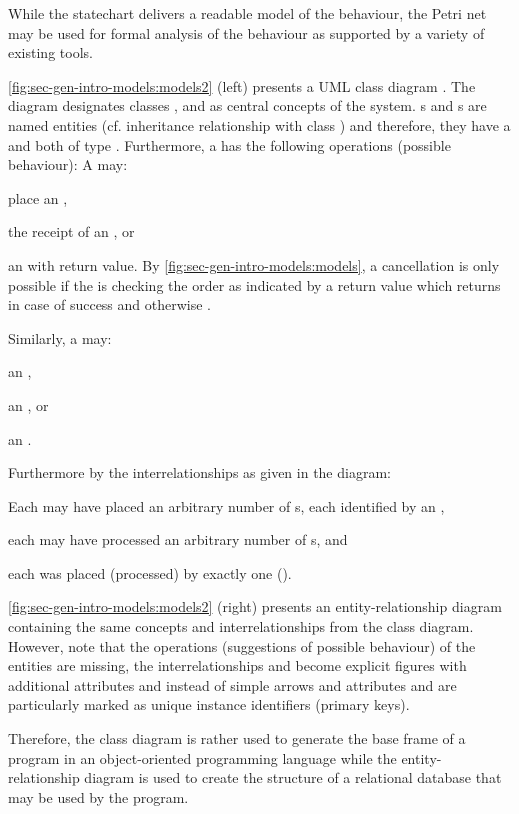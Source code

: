 While the statechart delivers a readable model of the behaviour, the Petri net may be used for formal analysis of the behaviour as supported by a variety of existing tools.

\cref{fig:sec-gen-intro-models:models2} (left) presents a UML class diagram \cite{UML15,Rumbaugh:2004:UML:993859}.
The diagram designates classes ,  and  as central concepts of the system.
s and s are named entities (cf. inheritance relationship with class ) and therefore, they have a  and  both of type .
Furthermore, a  has the following operations (possible behaviour):
A  may:
\begin{enumerate*}
\item place an  ,
\item {} the receipt of an  , or
\item {} an   with  return value. By \cref{fig:sec-gen-intro-models:models}, a cancellation is only possible if the  is checking the order as indicated by a  return value which returns  in case of success and otherwise .
\end{enumerate*}
Similarly, a  may:
\begin{enumerate*}
\item {} an  ,
\item {} an  , or
\item {} an  .
\end{enumerate*}
Furthermore by the interrelationships as given in the diagram:
\begin{enumerate*}
\item Each  may have placed an arbitrary number of s, each  identified by an ,
\item each  may have processed an arbitrary number of s, and
\item each  was placed (processed) by exactly one  ().
\end{enumerate*}

\cref{fig:sec-gen-intro-models:models2} (right) presents an entity-relationship diagram containing the same concepts and interrelationships from the class diagram.
However, note that the operations (suggestions of possible behaviour) of the entities are missing, the interrelationships  and  become explicit figures with additional attributes  and  instead of simple arrows and attributes  and  are particularly marked as unique instance identifiers (primary keys).

Therefore, the class diagram is rather used to generate the base frame of a program in an object-oriented programming language while the entity-relationship diagram is used to create the structure of a relational database that may be used by the program.